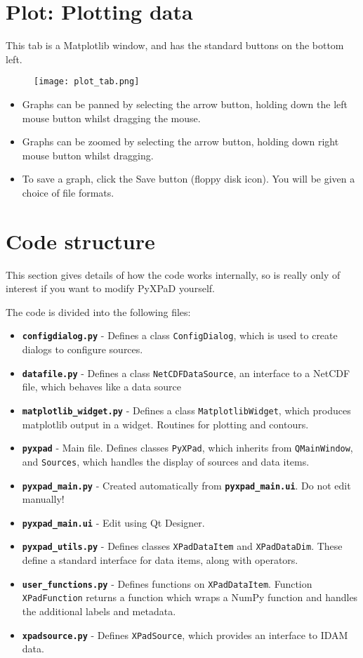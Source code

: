 \documentclass[12pt, a4paper]{article}
\newcommand{\code}[1]{\texttt{#1}}
\newcommand{\file}[1]{\texttt{\bf #1}}
\begin{document}
\section{Plot: Plotting data}

This tab is a Matplotlib window, and has the standard buttons on the bottom left.
\begin{figure}[h!]
  \centering
  \texttt{[image: plot\_tab.png]}
  \caption{}
  \label{fig:plot_tab}
\end{figure}
\begin{itemize}
\item Graphs can be panned by selecting the arrow button, holding down the left mouse button whilst dragging the mouse.
\item Graphs can be zoomed by selecting the arrow button, holding down right mouse button whilst dragging.
\item To save a graph, click the Save button (floppy disk icon). You will be given a choice of file formats.
\end{itemize}


\section{Code structure}

This section gives details of how the code works internally, so is really only of interest if you want to modify PyXPaD yourself.

The code is divided into the following files:
\begin{itemize}
\item \file{configdialog.py} - Defines a class \code{ConfigDialog}, which is used to create dialogs to configure sources.
\item \file{datafile.py} - Defines a class \code{NetCDFDataSource}, an interface to a NetCDF file, which behaves like a data source
\item \file{matplotlib\_widget.py} - Defines a class \code{MatplotlibWidget}, which produces matplotlib output in a widget. Routines for plotting and contours.
\item \file{pyxpad} - Main file. Defines classes \code{PyXPad}, which inherits from \code{QMainWindow}, and \code{Sources}, which handles the display of sources and data items.
\item \file{pyxpad\_main.py} - Created automatically from \file{pyxpad\_main.ui}. Do not edit manually!
\item \file{pyxpad\_main.ui} - Edit using Qt Designer.
\item \file{pyxpad\_utils.py} - Defines classes \code{XPadDataItem} and \code{XPadDataDim}. These define a standard interface for data items, along with operators.
\item \file{user\_functions.py} - Defines functions on \code{XPadDataItem}. Function \code{XPadFunction} returns a function which wraps a NumPy function and handles the additional labels and metadata.
\item \file{xpadsource.py} - Defines \code{XPadSource}, which provides an interface to IDAM data.
\end{itemize}
\end{document}

